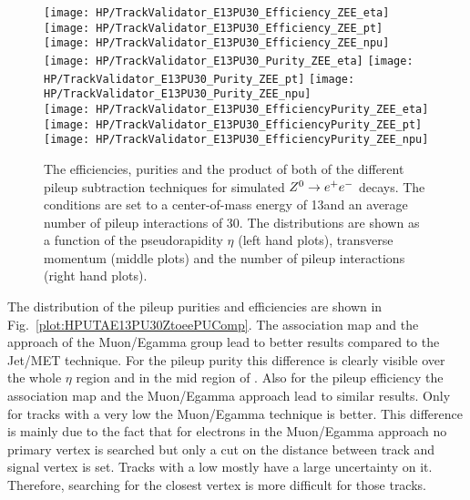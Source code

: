 \begin{figure}[!t]
  \centering
  \texttt{[image: HP/TrackValidator\_E13PU30\_Efficiency\_ZEE\_eta]}
  \texttt{[image: HP/TrackValidator\_E13PU30\_Efficiency\_ZEE\_pt]}
  \texttt{[image: HP/TrackValidator\_E13PU30\_Efficiency\_ZEE\_npu]}
   \\
  \texttt{[image: HP/TrackValidator\_E13PU30\_Purity\_ZEE\_eta]}
  \texttt{[image: HP/TrackValidator\_E13PU30\_Purity\_ZEE\_pt]}
  \texttt{[image: HP/TrackValidator\_E13PU30\_Purity\_ZEE\_npu]}
   \\
  \texttt{[image: HP/TrackValidator\_E13PU30\_EfficiencyPurity\_ZEE\_eta]}
  \texttt{[image: HP/TrackValidator\_E13PU30\_EfficiencyPurity\_ZEE\_pt]}
  \texttt{[image: HP/TrackValidator\_E13PU30\_EfficiencyPurity\_ZEE\_npu]}
  \caption[Purities, efficiencies and their product of the different pileup subtraction techniques for $\Zz\rightarrow\EE$ decays with 13\TeV and PU=30]{The efficiencies, purities and the product of both of the different pileup subtraction techniques for simulated $\Zz\rightarrow\EE$ decays. The conditions are set to a center-of-mass energy of 13\TeV and an average number of pileup interactions of 30. The distributions are shown as a function of the pseudorapidity $\eta$ (left hand plots), transverse momentum (middle plots) and the number of pileup interactions (right hand plots). \label{plot:HPUTAE13PU30ZtoeeComp}}
\end{figure}

The distribution of the pileup purities and efficiencies are shown in Fig.~\ref{plot:HPUTAE13PU30ZtoeePUComp}. The association map and the approach of the Muon/Egamma group lead to better results compared to the Jet/MET technique. For the pileup purity this difference is clearly visible over the whole $\eta$ region and in the mid region of \pt{}. Also for the pileup efficiency the association map and the Muon/Egamma approach lead to similar results. Only for tracks with a very low \pt the Muon/Egamma technique is better. This difference is mainly due to the fact that for electrons in the Muon/Egamma approach no primary vertex is searched but only a cut on the distance between track and signal vertex is set. Tracks with a low \pt mostly have a large uncertainty on it. Therefore, searching for the closest vertex is more difficult for those tracks.

